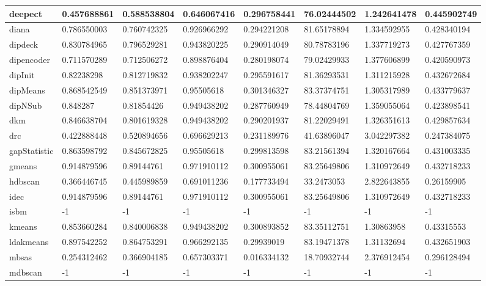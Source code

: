\begin{table}[H]
\begin{tabular}{|l|l|l|l|l|l|l|l|}
\hline
deepect & 0.457688861 & 0.588538804 & 0.646067416 & 0.296758441 & 76.02444502 & 1.242641478 & 0.445902749 \\
\hline
diana & 0.786550003 & 0.760742325 & 0.926966292 & 0.294221208 & 81.65178894 & 1.334592955 & 0.428340194 \\
\hline
dipdeck & 0.830784965 & 0.796529281 & 0.943820225 & 0.290914049 & 80.78783196 & 1.337719273 & 0.427767359 \\
\hline
dipencoder & 0.711570289 & 0.712506272 & 0.898876404 & 0.280198074 & 79.02429933 & 1.377606899 & 0.420590973 \\
\hline
dipInit & 0.82238298 & 0.812719832 & 0.938202247 & 0.295591617 & 81.36293531 & 1.311215928 & 0.432672684 \\
\hline
dipMeans & 0.868542549 & 0.851373971 & 0.95505618 & 0.301346327 & 83.37374751 & 1.305317989 & 0.433779637 \\
\hline
dipNSub & 0.848287 & 0.81854426 & 0.949438202 & 0.287760949 & 78.44804769 & 1.359055064 & 0.423898541 \\
\hline
dkm & 0.846638704 & 0.801619328 & 0.949438202 & 0.290201937 & 81.22029491 & 1.326351613 & 0.429857634 \\
\hline
drc & 0.422888448 & 0.520894656 & 0.696629213 & 0.231189976 & 41.63896047 & 3.042297382 & 0.247384075 \\
\hline
gapStatistic & 0.863598792 & 0.845672825 & 0.95505618 & 0.299813598 & 83.21561394 & 1.320167664 & 0.431003335 \\
\hline
gmeans & 0.914879596 & 0.89144761 & 0.971910112 & 0.300955061 & 83.25649806 & 1.310972649 & 0.432718233 \\
\hline
hdbscan & 0.366446745 & 0.445989859 & 0.691011236 & 0.177733494 & 33.2473053 & 2.822643855 & 0.26159905 \\
\hline
idec & 0.914879596 & 0.89144761 & 0.971910112 & 0.300955061 & 83.25649806 & 1.310972649 & 0.432718233 \\
\hline
isbm & -1 & -1 & -1 & -1 & -1 & -1 & -1 \\
\hline
kmeans & 0.853660284 & 0.840006838 & 0.949438202 & 0.300893852 & 83.35112751 & 1.30863958 & 0.43315553 \\
\hline
ldakmeans & 0.897542252 & 0.864753291 & 0.966292135 & 0.29939019 & 83.19471378 & 1.31132694 & 0.432651903 \\
\hline
mbsas & 0.254312462 & 0.366904185 & 0.657303371 & 0.016334132 & 18.70932744 & 2.376912454 & 0.296128494 \\
\hline
mdbscan & -1 & -1 & -1 & -1 & -1 & -1 & -1 \\

\end{tabular}
\end{table}
